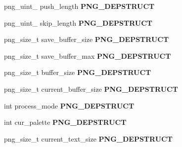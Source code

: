 \begin{DoxyCompactItemize}
\item 
png\+\_\+uint\+\_ push\+\_\+length {\bfseries P\+N\+G\+\_\+\+D\+E\+P\+S\+T\+R\+U\+CT}\hypertarget{structpng__struct__def_aef13adbcbb9798747696c38f91bd4ca6}{}\label{structpng__struct__def_aef13adbcbb9798747696c38f91bd4ca6}

\item 
png\+\_\+uint\+\_ skip\+\_\+length {\bfseries P\+N\+G\+\_\+\+D\+E\+P\+S\+T\+R\+U\+CT}\hypertarget{structpng__struct__def_a339fada35d707691e37e614886de0dc0}{}\label{structpng__struct__def_a339fada35d707691e37e614886de0dc0}

\item 
png\+\_\+size\+\_\+t save\+\_\+buffer\+\_\+size {\bfseries P\+N\+G\+\_\+\+D\+E\+P\+S\+T\+R\+U\+CT}\hypertarget{structpng__struct__def_a823f0a229bc84ae13174a0ffea20c079}{}\label{structpng__struct__def_a823f0a229bc84ae13174a0ffea20c079}

\item 
png\+\_\+size\+\_\+t save\+\_\+buffer\+\_\+max {\bfseries P\+N\+G\+\_\+\+D\+E\+P\+S\+T\+R\+U\+CT}\hypertarget{structpng__struct__def_a50e9d4efe6d4d7c7b3fef361d68a1f09}{}\label{structpng__struct__def_a50e9d4efe6d4d7c7b3fef361d68a1f09}

\item 
png\+\_\+size\+\_\+t buffer\+\_\+size {\bfseries P\+N\+G\+\_\+\+D\+E\+P\+S\+T\+R\+U\+CT}\hypertarget{structpng__struct__def_a3722b3e33785918970b62773d5c230d8}{}\label{structpng__struct__def_a3722b3e33785918970b62773d5c230d8}

\item 
png\+\_\+size\+\_\+t current\+\_\+buffer\+\_\+size {\bfseries P\+N\+G\+\_\+\+D\+E\+P\+S\+T\+R\+U\+CT}\hypertarget{structpng__struct__def_a8f2209911591847ebd29efb04390dfa8}{}\label{structpng__struct__def_a8f2209911591847ebd29efb04390dfa8}

\item 
int process\+\_\+mode {\bfseries P\+N\+G\+\_\+\+D\+E\+P\+S\+T\+R\+U\+CT}\hypertarget{structpng__struct__def_a2c741720283da1f3093506b254844a4e}{}\label{structpng__struct__def_a2c741720283da1f3093506b254844a4e}

\item 
int cur\+\_\+palette {\bfseries P\+N\+G\+\_\+\+D\+E\+P\+S\+T\+R\+U\+CT}\hypertarget{structpng__struct__def_ac23b6c76ea8a9ac35b11a56053015139}{}\label{structpng__struct__def_ac23b6c76ea8a9ac35b11a56053015139}

\item 
png\+\_\+size\+\_\+t current\+\_\+text\+\_\+size {\bfseries P\+N\+G\+\_\+\+D\+E\+P\+S\+T\+R\+U\+CT}\hypertarget{structpng__struct__def_a4fae46ecb38fa24f7de8202dc9e7db39}{}\label{structpng__struct__def_a4fae46ecb38fa24f7de8202dc9e7db39}


\end{DoxyCompactItemize}

